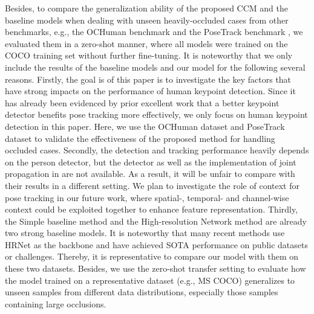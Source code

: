 \documentclass[twocolumn]{svjour3}          \smartqed  \usepackage{natbib}
\begin{document}
Besides, to compare the generalization ability of the proposed CCM and the baseline models when dealing with unseen heavily-occluded cases from other benchmarks, e.g., the OCHuman benchmark \citep{zhang2019pose} and the PoseTrack benchmark \citep{Andriluka2018PoseTrack}, we evaluated them in a zero-shot manner, where all models were trained on the COCO training set without further fine-tuning. It is noteworthy that we only include the results of the baseline models and our model for the following several reasons. Firstly, the goal is of this paper is to investigate the key factors that have strong impacts on the performance of human keypoint detection. Since it has already been evidenced by prior excellent work \citep{xiao2018simple,sun2019deep} that a better keypoint detector benefits pose tracking more effectively, we only focus on human keypoint detection in this paper. Here, we use the OCHuman dataset and PoseTrack dataset to validate the effectiveness of the proposed method for handling occluded cases. Secondly, the detection and tracking performance heavily depends on the person detector, but the detector as well as the implementation of joint propagation in \citep{xiao2018simple,sun2019deep} are not available. As a result, it will be unfair to compare with their results in a different setting. We plan to investigate the role of context for pose tracking in our future work, where spatial-, temporal- and channel-wise context could be exploited together to enhance feature representation. Thirdly, the Simple baseline method \citep{xiao2018simple} and the High-resolution Network method \citep{sun2019deep} are already two strong baseline models. It is noteworthy that many recent methods use HRNet as the backbone and have achieved SOTA performance on public datasets or challenges. Thereby, it is representative to compare our model with them on these two datasets. Besides, we use the zero-shot transfer setting to evaluate how the model trained on a representative dataset (e.g., MS COCO) generalizes to unseen samples from different data distributions, especially those samples containing large occlusions.
\end{document}
